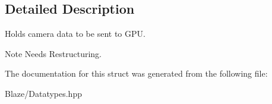 \subsection{Detailed Description}
Holds camera data to be sent to G\+PU. 

\begin{DoxyNote}{Note}
Needs Restructuring. 
\end{DoxyNote}


The documentation for this struct was generated from the following file\+:\begin{DoxyCompactItemize}
\item 
Blaze/Datatypes.\+hpp\end{DoxyCompactItemize}
